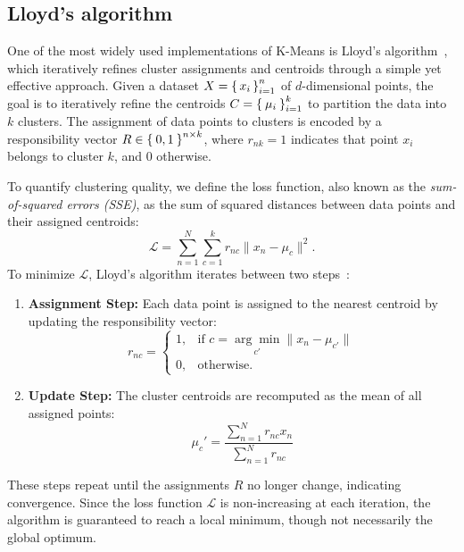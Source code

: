 \documentclass[10pt,twocolumn,letterpaper]{article}
\begin{document}

\subsection{Lloyd's algorithm}\label{subsec:procedure-and-lloyd's-algorithm}

One of the most widely used implementations of K-Means is Lloyd’s
algorithm~\cite{deuschle2019}, which iteratively refines cluster assignments
and centroids through a simple yet effective approach. Given a dataset
$X=\set{x_i}_{i=1}^n$ of $d$-dimensional points, the goal is to iteratively
refine the centroids $C=\Set{\mu_i}_{i=1}^k$ to partition the data into $k$
clusters. The assignment of data points to clusters is encoded by a
responsibility vector $R\in\Set{0,1}^{n\times k}$, where $r_{nk}=1$ indicates
that point $x_i$ belongs to cluster $k$, and $0$ otherwise.

To quantify clustering quality, we define the loss function, also known as the
\textit{sum-of-squared errors (SSE)}, as the sum of squared distances between
data points and their assigned centroids:
\begin{equation}
    \label{eq:lloyds-loss}
    \mathcal{L} = \sum_{n=1}^{N} \sum_{c=1}^{k} r_{nc} \|x_n - \mu_c\|^2.
\end{equation}
To minimize $\mathcal{L}$, Lloyd's algorithm iterates between two steps~\cite{deuschle2019, FRANTI201995}:
\begin{enumerate}
    \item \textbf{Assignment Step:} Each data point is assigned to the nearest centroid by updating the responsibility vector:
          \begin{equation}
              \label{eq:lloyds-res-vec}
              r_{nc} =
              \begin{cases}
                  1, & \text{if } c = \underset{c'}{\arg\min} \|x_n - \mu_{c'}\| \\
                  0, & \text{otherwise.}
              \end{cases}
          \end{equation}
    \item \textbf{Update Step:} The cluster centroids are recomputed as the mean of all assigned points:
          \begin{equation}
              \label{eq:min-lloyds-loss}
              \mu_c' = \frac{\sum_{n=1}^{N} r_{nc} x_n}{\sum_{n=1}^{N} r_{nc}}
          \end{equation}
\end{enumerate}
These steps repeat until the assignments $R$ no longer change, indicating
convergence. Since the loss function $\mathcal{L}$ is non-increasing at each
iteration, the algorithm is guaranteed to reach a local minimum, though not
necessarily the global optimum.
\end{document}
